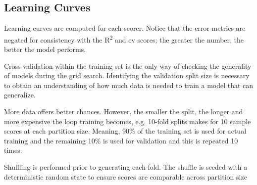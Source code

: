 \documentclass[aip, jmp, amsmath, amssymb, nofootinbib]{revtex4-2}
\begin{document}
\subsection*{Learning Curves}
\label{sec:org35444de}
Learning curves are computed for each scorer. Notice that the error
metrics are negated for consistency with the R\textsuperscript{2} and ev scores; the
greater the number, the better the model performs.

Cross-validation within the training set is the only way of checking
the generality of models during the grid search. Identifying the
validation split size is necessary to obtain an understanding of how
much data is needed to train a model that can generalize.

More data offers better chances. However, the smaller the split, the
longer and more expensive the loop training becomes, e.g. 10-fold
splits makes for 10 sample scores at each partition size. Meaning, 90\%
of the training set is used for actual training and the remaining 10\%
is used for validation and this is repeated 10 times.

Shuffling is performed prior to generating each fold. The shuffle is
seeded with a deterministic random state to ensure scores are
comparable across partition size
\end{document}
